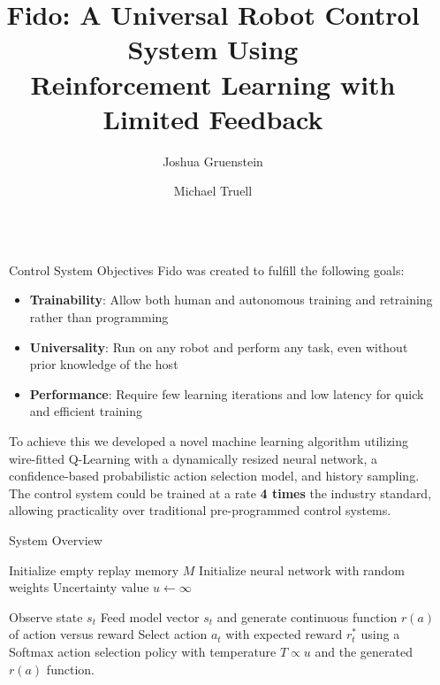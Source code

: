 \documentclass[final]{beamer}
\title{Fido: A Universal Robot Control System Using\\Reinforcement Learning with Limited Feedback}
\author{\LARGE Joshua Gruenstein \and Michael Truell}
\institute{\mbox{}}
\newlength{\sepwid}
\newlength{\onecolwid}
\begin{document}
\setlength{\belowcaptionskip}{2ex}
\setlength\belowdisplayshortskip{2ex}

\begin{frame}[t]
\begin{columns}[t]

\begin{column}{\sepwid}\end{column}
\begin{column}{\onecolwid}

	\begin{alertblock}{Control System Objectives}
		Fido was created to fulfill the following goals:
		\begin{itemize}
			\item \textbf{Trainability}: Allow both human and autonomous training and retraining rather than programming
			\item \textbf{Universality}: Run on any robot and perform any task, even without prior knowledge of the host
			\item \textbf{Performance}: Require few learning iterations and low latency for quick and efficient training
		\end{itemize}
		To achieve this we developed a novel machine learning algorithm utilizing wire-fitted Q-Learning with a dynamically resized neural network, a confidence-based probabilistic action selection model, and history sampling.  The control system could be trained at a rate \textbf{4 times} the industry standard, allowing practicality over traditional pre-programmed control systems.
	\end{alertblock}

	\begin{block}{System Overview}
		\begin{algorithm}[H]
		\caption*{\textbf{Fido Control System Algorithm}}\label{euclid}
		\small
		\begin{algorithmic}[1]
			\State Initialize empty replay memory $M$
			\State Initialize neural network with random weights
			\State Uncertainty value $u \gets \infty$

			  \State Observe state $s_t$
			  \State Feed model vector $s_t$ and generate continuous function $r(a)$ of action versus reward
			  \State Select action $a_t$ with expected reward $r_t^*$ using a Softmax action selection policy with temperature $T \propto u$ and the generated $r(a)$ function.


\end{algorithmic}
\end{algorithm}
\end{block}
\end{column}
\end{columns}
\end{frame}
\end{document}
